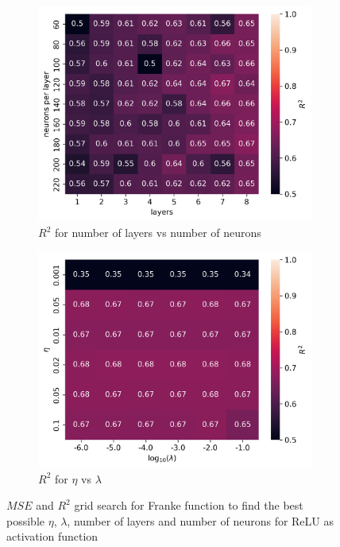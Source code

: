 \documentclass[11pt]{article}
\begin{document}
\begin{figure}[H]
\begin{subfigure}{.5\textwidth}
    \centering
    \includegraphics[width=\textwidth]{../figures/franke_L_n_test_relu_R2.png}
    \caption{$R^2$ for number of layers vs number of neurons}
    \label{fig:}
  \end{subfigure}
  \begin{subfigure}{.5\textwidth}
    \centering
    \includegraphics[width=\textwidth]{../figures/franke_eta_lmb_relu_R2.png}
    \caption{$R^2$ for $\eta$ vs $\lambda$}
    \label{fig:}
  \end{subfigure}
  \caption{$MSE$ and $R^2$ grid search for Franke function to find the best possible $\eta$, $\lambda$, number of layers and number of neurons for ReLU as activation function}
  \label{fig:franke_grid_2}
\end{figure}
\end{document}
